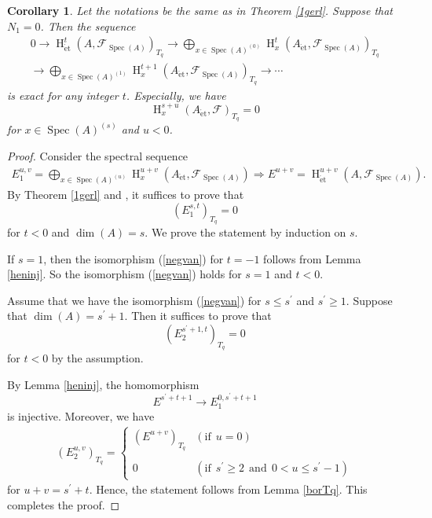 \documentclass{article}
\newtheorem{cor}[thm]{\indent \sc Corollary}
\newcommand{\spec}{\operatorname{Spec}}
\newcommand{\et}{\mathrm{\acute{e}t}}
\newcommand{\HO}{\operatorname{H}}
\begin{document}
%
\begin{cor}\upshape\label{exBGO}
Let the notations be the same as in Theorem \ref{1gerl}. Suppose that $N_{1}=0$. Then the sequence 
%
\begin{align*}
0\to \HO^{t}_{\et}(A, \mathcal{F}_{\spec(A)})_{T_{q}}
\to
\bigoplus_{x\in \spec(A)^{(0)}}
\HO^{t}_{x}(A_{\et}, 
\mathcal{F}_{\spec(A)})_{T_{q}}
\\
\to
\bigoplus_{x\in \spec(A)^{(1)}}
\HO^{t+1}_{x}(A_{\et}, 
\mathcal{F}_{\spec(A)})_{T_{q}} 
\to
\cdots
\end{align*}
%
is exact for any integer $t$.
Especially, we have 
%
\begin{equation*}
\HO_{x}^{s+u}(A_{\et}, \mathcal{F})_{T_{q}}
=0
\end{equation*}
%
for $x\in \spec(A)^{(s)}$ and
$u<0$.
\end{cor}
%

%
\begin{proof}\upshape
Consider the spectral sequence
%
\begin{align*}
E^{u, v}_{1}
= 
\bigoplus_{x\in \spec(A)^{(u)}}
\HO_{x}^{u+v}(A_{\et}, \mathcal{F}_{\spec(A)})
\Rightarrow
E^{u+v}
=
\HO_{\et}^{u+v}(A, \mathcal{F}_{\spec(A)}).
\end{align*}
%
By Theorem \ref{1gerl} and \cite[p.93, III, Corollary 1.28]{M}, 
it suffices to prove that
%
\begin{equation}\label{negvan}
(E^{s, t}_{1})_{T_{q}}=0    
\end{equation}
%
for $t<0$ and $\operatorname{dim}(A)=s$. We prove the statement by induction on 
$s$.

If $s=1$, then the isomorphism (\ref{negvan}) for $t=-1$ follows from Lemma \ref{heninj}.
So the isomorphism (\ref{negvan}) holds for $s=1$ and $t<0$.

Assume that we have the isomorphism (\ref{negvan}) for $s\leq s^{\prime}$ and $s^{\prime}\geq 1$.
Suppose that $\operatorname{dim}(A)=s^{\prime}+1$. Then it suffices to prove that
%
\begin{equation*}
(E_{2}^{s^{\prime}+1, t})_{T_{q}}=0    
\end{equation*}
%
for $t<0$ by the assumption. 

By Lemma \ref{heninj}, the homomorphism
%
\begin{equation*}
E^{s^{\prime}+t+1}
\to 
E^{0, s^{\prime}+t+1}_{1}
\end{equation*}
%
is injective. Moreover, we have
%
\begin{align*}
(E^{u, v}_{2})_{T_{q}}
=
%
\begin{cases}
(E^{u+v})_{T_{q}}
& (\textrm{if}~~u=0) \\
\\
0
& (\textrm{if}~~s^{\prime}\geq 2~~\textrm{and}~~0<u\leq s^{\prime}-1)
\end{cases}
%
\end{align*}
%
for $u+v=s^{\prime}+t$. Hence, the statement follows from Lemma \ref{borTq}. 
This completes the proof.
 
%
\end{proof}
%
\end{document}
